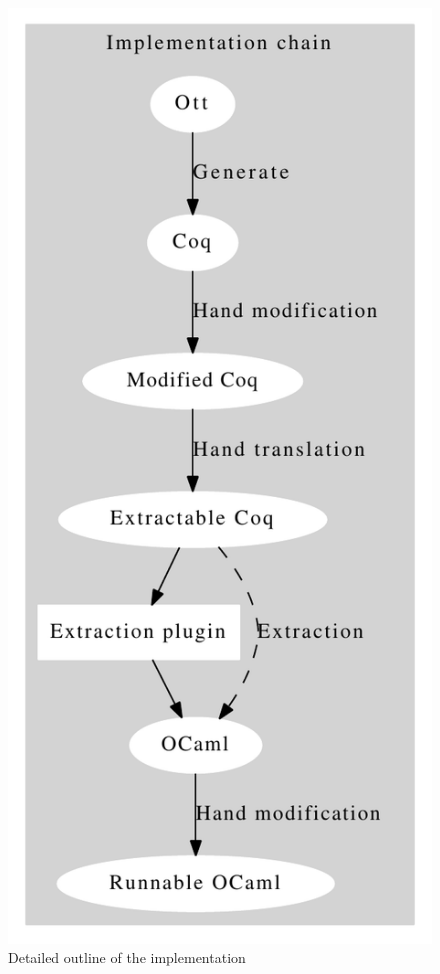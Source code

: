 \documentclass[12pt,twoside,notitlepage]{report}
\begin{document}
\begin{figure}[h]
\begin{center}
\includegraphics[scale=0.5]{implOut}
\caption{Detailed outline of the implementation}
\label{fig:detailedimploutline}
\end{center}
\end{figure}
\end{document}
